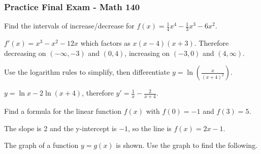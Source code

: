 \documentclass[12pt]{exam}
\newcommand{\ds}{\displaystyle}
\begin{document}
\pagestyle{empty}
\subsubsection*{Practice Final Exam - Math 140 }
\begin{questions}

\question Find the intervals of increase/decrease for $f(x) = \frac{1}{4}x^4 - \frac{1}{3}x^3 - 6 x^{2}$.
\begin{solution}
$f'(x) = x^3 - x^2 - 12x$ which factors as $x(x-4)(x+3)$.  Therefore decreasing on $(-\infty,-3)$ and $(0,4)$, increasing on $(-3,0)$ and $(4,\infty)$.
\end{solution}
\vfill

\question Use the logarithm rules to simplify, then differentiate $\ds y= \ln \left( \frac{x}{(x+4)^2} \right)$.  
\begin{solution}
$\ds y = \ln x - 2 \ln (x+4)$, therefore $\ds y' = \frac{1}{x} - \frac{2}{x+4}$. 
\end{solution}
\vfill


\question Find a formula for the linear function $f(x)$ with $f(0) = -1$ and $f(3) = 5$.  
\begin{solution}
The slope is 2 and the y-intercept is $-1$, so the line is $f(x) = 2x-1$.
\end{solution}
\vfill


\question The graph of a function $y = g(x)$ is shown.  Use the graph to find the following.

\noindent
\begin{minipage}{0.4\textwidth}
\end{minipage}
\end{questions}
\end{document}
